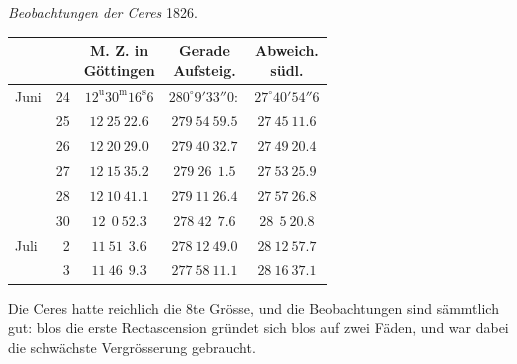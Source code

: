 \begin{center}
\emph{Beobachtungen der Ceres} 1826.
\end{center}

\begin{center}
\begingroup\small\setlength{\tabcolsep}{4pt}
\begin{tabular}{lr|c|c|c}
 & & \shortstack{M. Z. in\\Göttingen} & \shortstack{Gerade\\Aufsteig.} & \shortstack{Abweich.\\südl.} \\
\hline
Juni & 24 & $12^{\mathrm u}30^{\mathrm m}16^{\mathrm s}6$ & $280^\circ 9' 33''0:$ & $27^\circ 40' 54''6$ \\
 & 25 & $12\ 25\ 22.6$ & $279\ 54\ 59.5$ & $27\ 45\ 11.6$ \\
 & 26 & $12\ 20\ 29.0$ & $279\ 40\ 32.7$ & $27\ 49\ 20.4$ \\
 & 27 & $12\ 15\ 35.2$ & $279\ 26\ \ 1.5$ & $27\ 53\ 25.9$ \\
 & 28 & $12\ 10\ 41.1$ & $279\ 11\ 26.4$ & $27\ 57\ 26.8$ \\
 & 30 & $12\ \ 0\ 52.3$ & $278\ 42\ \ 7.6$ & $28\ \ 5\ 20.8$ \\
Juli & \ 2 & $11\ 51\ \ 3.6$ & $278\ 12\ 49.0$ & $28\ 12\ 57.7$ \\
 & \ 3 & $11\ 46\ \ 9.3$ & $277\ 58\ 11.1$ & $28\ 16\ 37.1$ \\
\end{tabular}
\endgroup
\end{center}

Die Ceres hatte reichlich die 8te Grösse, und die Beobachtungen sind sämmtlich gut: blos
die erste Rectascension gründet sich blos auf zwei Fäden, und war dabei die schwächste
Vergrösserung gebraucht.
